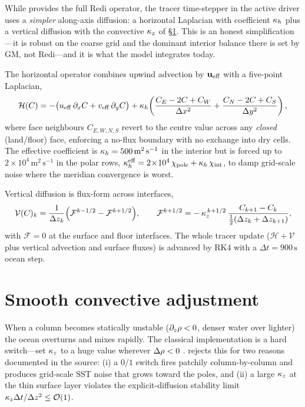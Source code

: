 While  provides the full Redi operator, the tracer time-stepper
in the active driver uses a \emph{simpler} along-axis diffusion: a horizontal
Laplacian with coefficient $\kappa_{h}$ plus a vertical diffusion with the convective
$\kappa_{z}$ of \S\ref{sec:convect}. This is an honest simplification---it is robust on the
coarse grid and the dominant interior balance there is set by GM, not Redi---and it
is what the model integrates today.

The horizontal operator combines upwind advection by $\mathbf{u}_{\mathrm{eff}}$ with a
five-point Laplacian,
\begin{equation}
\mathcal{H}(C) = -\big(u_{\mathrm{eff}}\,\partial_x C + v_{\mathrm{eff}}\,\partial_y C\big)
+ \kappa_{h}\!\left(\frac{C_E - 2C + C_W}{\Delta x^2} + \frac{C_N - 2C + C_S}{\Delta y^2}\right),
\label{eq:hdiff}
\end{equation}
where face neighbours $C_{E,W,N,S}$ revert to the centre value across any \emph{closed}
(land/floor) face, enforcing a no-flux boundary with no exchange into dry cells.
The effective coefficient is $\kappa_{h}=500\,\mathrm{m^2\,s^{-1}}$ in the interior but is
forced up to $2\times10^4\,\mathrm{m^2\,s^{-1}}$ in the polar rows,
$\kappa_{h}^{\mathrm{eff}} = 2\!\times\!10^4\,\chi_{\mathrm{pole}} + \kappa_{h}\,\chi_{\mathrm{int}}$,
to damp grid-scale noise where the meridian convergence is worst.

Vertical diffusion is flux-form across interfaces,
\begin{equation}
\mathcal{V}(C)_k = \frac{1}{\Delta z_k}\Big(\mathcal{F}^{k-1/2} - \mathcal{F}^{k+1/2}\Big),
\qquad
\mathcal{F}^{k+1/2} = -\,\kappa_{z}^{\,k+1/2}\,\frac{C_{k+1}-C_k}{\tfrac12(\Delta z_k+\Delta z_{k+1})},
\label{eq:vdiff}
\end{equation}
with $\mathcal{F}=0$ at the surface and floor interfaces. The whole tracer update
($\mathcal{H}+\mathcal{V}$ plus vertical advection and surface fluxes) is advanced by
RK4 with a $\Delta t=900\,\mathrm{s}$ ocean step.

\section{Smooth convective adjustment}\label{sec:convect}

When a column becomes statically unstable ($\partial_z\rho<0$, denser water over
lighter) the ocean overturns and mixes rapidly. The classical implementation is a
hard switch---set $\kappa_{z}$ to a huge value wherever $\Delta\rho<0$ \citep{rahmstorf1993}. \model{} rejects
this for two reasons documented in the source: (i) a $0/1$ switch fires patchily
column-by-column and produces grid-scale SST noise that grows toward the poles, and
(ii) a large $\kappa_{z}$ at the thin surface layer violates the explicit-diffusion
stability limit $\kappa_{z}\Delta t/\Delta z^2 \le \mathcal{O}(1)$.


